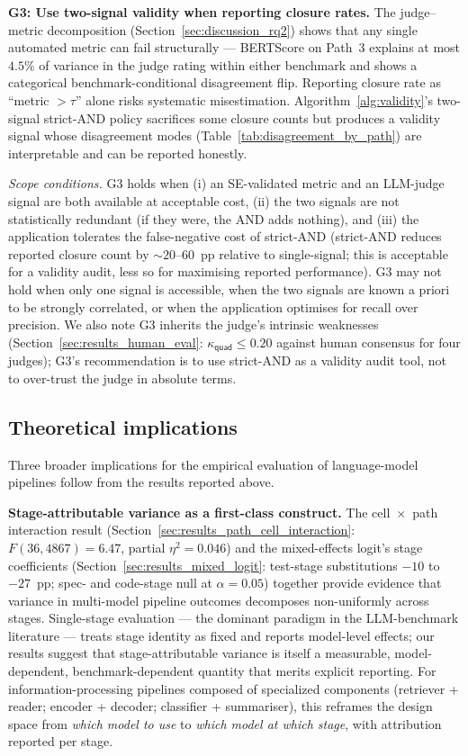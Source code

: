 \textbf{G3: Use two-signal validity when reporting closure rates.} The judge--metric decomposition (Section~\ref{sec:discussion_rq2}) shows that any single automated metric can fail structurally --- BERTScore on Path~3 explains at most $4.5\%$ of variance in the judge rating within either benchmark and shows a categorical benchmark-conditional disagreement flip. Reporting closure rate as ``metric $> \tau$'' alone risks systematic misestimation. Algorithm~\ref{alg:validity}'s two-signal strict-AND policy sacrifices some closure counts but produces a validity signal whose disagreement modes (Table~\ref{tab:disagreement_by_path}) are interpretable and can be reported honestly.

\emph{Scope conditions.} G3 holds when (i) an SE-validated metric and an LLM-judge signal are both available at acceptable cost, (ii) the two signals are not statistically redundant (if they were, the AND adds nothing), and (iii) the application tolerates the false-negative cost of strict-AND (strict-AND reduces reported closure count by $\sim$$20$--$60$~pp relative to single-signal; this is acceptable for a validity audit, less so for maximising reported performance). G3 may not hold when only one signal is accessible, when the two signals are known a priori to be strongly correlated, or when the application optimises for recall over precision. We also note G3 inherits the judge's intrinsic weaknesses (Section~\ref{sec:results_human_eval}: $\kappa_{\textsf{quad}} \leq 0.20$ against human consensus for four judges); G3's recommendation is to use strict-AND as a validity audit tool, not to over-trust the judge in absolute terms.

\subsection{Theoretical implications}
\label{sec:discussion_theoretical}

Three broader implications for the empirical evaluation of language-model pipelines follow from the results reported above.

\textbf{Stage-attributable variance as a first-class construct.} The cell~$\times$~path interaction result (Section~\ref{sec:results_path_cell_interaction}: $F(36, 4867) = 6.47$, partial $\eta^2 = 0.046$) and the mixed-effects logit's stage coefficients (Section~\ref{sec:results_mixed_logit}: test-stage substitutions $-10$ to $-27$~pp; spec- and code-stage null at $\alpha = 0.05$) together provide evidence that variance in multi-model pipeline outcomes decomposes non-uniformly across stages. Single-stage evaluation --- the dominant paradigm in the LLM-benchmark literature --- treats stage identity as fixed and reports model-level effects; our results suggest that stage-attributable variance is itself a measurable, model-dependent, benchmark-dependent quantity that merits explicit reporting. For information-processing pipelines composed of specialized components (retriever + reader; encoder + decoder; classifier + summariser), this reframes the design space from \emph{which model to use} to \emph{which model at which stage}, with attribution reported per stage.

